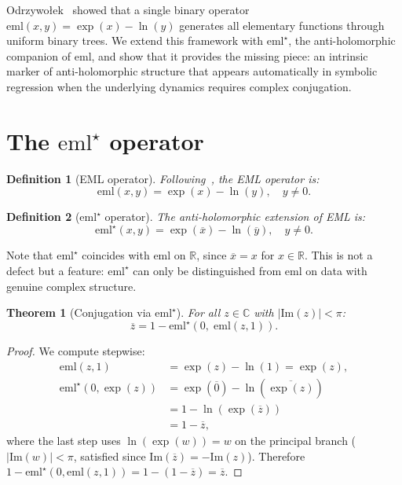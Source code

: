 \documentclass[12pt,a4paper]{article}
\newtheorem{theorem}{Theorem}
\newtheorem{definition}{Definition}
\newcommand{\emlstar}{\mathrm{eml}^{\star}}
\newcommand{\eml}{\mathrm{eml}}
\newcommand{\conj}[1]{\overline{#1}}
\begin{document}
Odrzywołek~\citep{odrzywołek2026eml} showed that a single binary
operator $\eml(x,y) = \exp(x) - \ln(y)$ generates all elementary
functions through uniform binary trees.
We extend this framework with $\emlstar$, the anti-holomorphic
companion of $\eml$, and show that it provides the missing piece:
an intrinsic marker of anti-holomorphic structure that appears
automatically in symbolic regression when the underlying dynamics
requires complex conjugation.


\section{The $\emlstar$ operator}
\label{sec:emlstar}

\begin{definition}[EML operator]
Following~\citet{odrzywołek2026eml}, the EML operator is:
\begin{equation}
\eml(x,y) = \exp(x) - \ln(y), \quad y \neq 0.
\end{equation}
\end{definition}

\begin{definition}[$\emlstar$ operator]
The anti-holomorphic extension of EML is:
\begin{equation}
\emlstar(x,y) = \exp(\conj{x}) - \ln(\conj{y}), \quad y \neq 0.
\label{eq:emlstar}
\end{equation}
\end{definition}

\noindent
Note that $\emlstar$ coincides with $\eml$ on $\mathbb{R}$,
since $\conj{x} = x$ for $x \in \mathbb{R}$.
This is not a defect but a feature:
$\emlstar$ can only be distinguished from $\eml$ on data with
genuine complex structure.

\begin{theorem}[Conjugation via $\emlstar$]
\label{thm:conj}
For all $z \in \mathbb{C}$ with $|\mathrm{Im}(z)| < \pi$:
\begin{equation}
\conj{z} = 1 - \emlstar\!\left(0,\; \eml(z, 1)\right).
\label{eq:conj}
\end{equation}
\end{theorem}

\begin{proof}
We compute stepwise:
\begin{align}
\eml(z, 1) &= \exp(z) - \ln(1) = \exp(z), \\
\emlstar(0, \exp(z)) &= \exp(\conj{0}) - \ln(\conj{\exp(z)}) \\
  &= 1 - \ln(\exp(\conj{z})) \\
  &= 1 - \conj{z},
\end{align}
where the last step uses $\ln(\exp(w)) = w$ on the principal branch
($|\mathrm{Im}(w)| < \pi$, satisfied since $\mathrm{Im}(\conj{z}) = -\mathrm{Im}(z)$).
Therefore $1 - \emlstar(0, \eml(z,1)) = 1 - (1 - \conj{z}) = \conj{z}$.
\end{proof}
\end{document}
